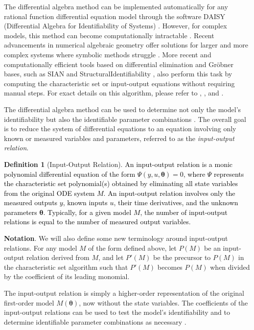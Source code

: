 \documentclass[a4paper,fleqn]{cas-dc}
\theoremstyle{definition}
\newtheorem{definition}{Definition}
\begin{document}
The differential algebra method can be implemented automatically for any rational function differential equation model through the software DAISY (Differential Algebra for Identifiability of Systems) \cite{bellu2007daisy}. However, for complex models, this method can become computationally intractable \cite{saccomani2003parameter}. Recent advancements in numerical algebraic geometry offer solutions for larger and more complex systems where symbolic methods struggle \cite{bates2019identifiability}.
More recent and computationally efficient tools based on differential elimination and Gr\"{o}bner bases, such as SIAN \cite{hong2019sian} and StructuralIdentifiability \cite{dong2023differential}, also perform this task by computing the characteristic set or input-output equations without requiring manual steps. For exact details on this algorithm, please refer to \citet{ritt1950differential}, \citet{bellu2007daisy}, and \citet{saccomani2003parameter}. 

The differential algebra method can be used to determine not only the model's identifiability but also the identifiable parameter combinations \cite{eisenberg2013input}.
The overall goal is to reduce the system of differential equations to an equation involving only known or measured variables and parameters, referred to as the \textit{input-output relation}.


\begin{definition}[Input-Output Relation]
\textcolor{black}{An input-output relation is a monic polynomial differential equation of the form $\Psi(y, u, \pmb{\theta}) = 0$, where $\Psi$ represents the characteristic set polynomial(s) obtained by eliminating all state variables from the original ODE system $M$. An input-output relation involves only the measured outputs $y$, known inputs $u$, their time derivatives, and the unknown parameters $\pmb{\theta}$. Typically, for a given model $M$, the number of input-output relations is equal to the number of measured output variables.}
\end{definition}

\noindent\textbf{Notation}. We will also define some new terminology around input-output relations.
For any model $M$ of the form defined above, let $P(M)$ be an input-output relation derived from $M$, and let $P'(M)$ be the precursor to $P(M)$ in the characteristic set algorithm such that $P'(M)$ becomes $P(M)$ when divided by the coefficient of its leading monomial.

\vspace{0.2cm}
\noindent The input-output relation is simply a higher-order representation of the original first-order model $M(\pmb{\theta})$, now without the state variables.
The coefficients of the input-output relations can be used to test the model's identifiability and to determine identifiable parameter combinations as necessary \cite{eisenberg2013input}.
\end{document}

